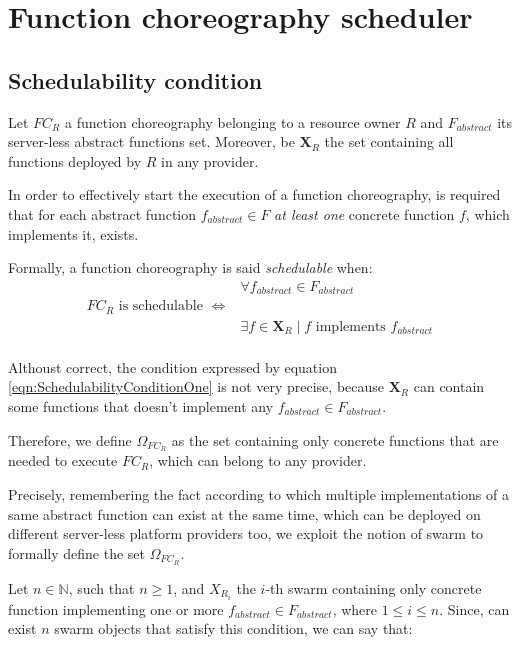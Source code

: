 \documentclass[10pt,a4paper]{article}
\begin{document}
\section{Function choreography scheduler}

\subsection{Schedulability condition}

Let $FC_R$ a function choreography belonging to a resource owner $R$ and $F_{abstract}$ its server-less abstract functions set. Moreover, be $\textbf{X}_R$ the set containing all functions deployed by $R$ in any provider.

In order to effectively start the execution of a function choreography, is required that for each abstract function $f_{abstract} \in F$ \textit{at least one} concrete function $f$, which implements it, exists.

Formally, a function choreography is said \textit{schedulable} when: 
\begin{equation}
\label{eqn:SchedulabilityConditionOne}
\begin{array}{lc}

& \forall f_{abstract} \in F_{abstract} \\

FC_R \text{ is schedulable } \Leftrightarrow & \\
 & \exists f \in \textbf{X}_R \mid  f \text{ implements } f_{abstract} \\
\end{array}
\end{equation}

Althoust correct, the condition expressed by equation \ref{eqn:SchedulabilityConditionOne} is not very precise, because $\textbf{X}_R$ can contain some functions that doesn't implement any $f_{abstract} \in F_{abstract}$.

Therefore, we define $\Omega_{FC_R}$ as the set containing only concrete functions that are needed to execute $FC_R$, which can belong to any provider.

Precisely, remembering the fact according to which multiple implementations of a same abstract function can exist at the same time, which can be deployed on different server-less platform providers too, we exploit the notion of swarm to formally define the set $\Omega_{FC_R}$.

Let $n \in \mathbb{N}$, such that $n \geq 1$, and $X_{R_i}$ the $i$-th swarm containing only concrete function implementing one or more $f_{abstract} \in F_{abstract}$, where $1 \leq i \leq n$. Since, can exist $n$ swarm objects that satisfy this condition, we can say that:
\end{document}
